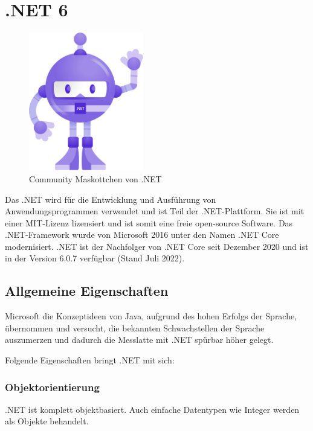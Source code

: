 \section{.NET 6}
\begin{figure}[h]
    \begin{center}
        \includegraphics*[width=5cm]{pics/Dotnet-bot.png}
        \caption[Community Maskottchen von .NET]{Community Maskottchen von .NET \cite{DotNetBot}}
    \end{center}
\end{figure}

\cite{CSharp8Rheinwerk}
\cite{DotNet6Documentation}
\cite{DotNet6Wikipedia}

Das .NET wird für die Entwicklung und Ausführung von Anwendungsprogrammen verwendet und ist Teil der .NET-Plattform.
Sie ist mit einer MIT-Lizenz lizensiert und ist somit eine freie open-source Software. Das .NET-Framework wurde von Microsoft 
2016 unter den Namen .NET Core modernisiert. .NET ist der Nachfolger von .NET Core seit Dezember 2020 und ist in der Version 6.0.7 verfügbar (Stand Juli 2022).

\subsection{Allgemeine Eigenschaften}
Microsoft die Konzeptideen von Java, aufgrund des hohen Erfolgs der Sprache,
übernommen und versucht, die bekannten Schwachstellen der Sprache auszumerzen und dadurch die Messlatte mit 
.NET spürbar höher gelegt.

Folgende Eigenschaften bringt .NET mit sich:

\subsubsection{Objektorientierung}
.NET ist komplett objektbasiert. Auch einfache Datentypen wie Integer werden als Objekte behandelt.

